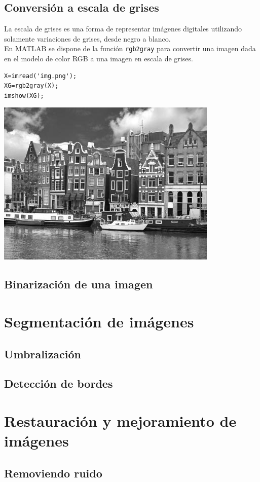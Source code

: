 \subsection{Conversión a escala de grises}

La escala de grises es una forma de representar imágenes digitales utilizando solamente variaciones 
de grises, desde negro a blanco.\\

En MATLAB se dispone de la función \texttt{rgb2gray} para convertir una imagen dada en el modelo de color RGB 
a una imagen en escala de grises.

\begin{verbatim}
X=imread('img.png');
XG=rgb2gray(X);
imshow(XG);
\end{verbatim}

\begin{center}
\includegraphics[scale=0.7]{src/ch7/holland_gris.png}
\end{center}

\subsection{Binarización de una imagen}

\section{Segmentación de imágenes}

\subsection{Umbralización}

\subsection{Detección de bordes}

\section{Restauración y mejoramiento de imágenes}

\subsection{Removiendo ruido}